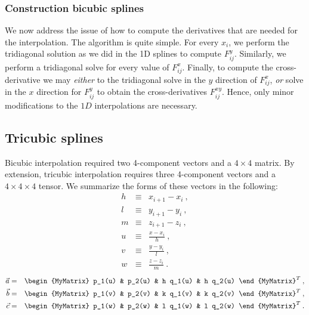 \subsubsection{Construction bicubic splines}
We now address the issue of how to compute the derivatives that are
needed for the interpolation.  The algorithm is quite simple.  For
every $x_i$, we perform the tridiagonal solution as we did in the 1D
splines to compute $F^y_{ij}$.  Similarly, we perform a tridiagonal
solve for every value of $F^x_{ij}$.  Finally, to compute the
cross-derivative we may {\em either} to the tridiagonal solve in the $y$
direction of $F^x_{ij}$, {\em or} solve in the $x$ direction for
$F^y_{ij}$ to obtain the cross-derivatives $F^{xy}_{ij}$.  Hence,
only minor modifications to the $1D$ interpolations are necessary.

\subsection{Tricubic splines}
Bicubic interpolation required two 4-component vectors and a $4 \times 4$
matrix.  By extension, tricubic interpolation requires three
4-component vectors and a $4 \times 4 \times 4$ tensor.  We summarize the forms of
these vectors in the following:
\begin{eqnarray}
h & \equiv & x_{i+1}-x_i\:, \\
l & \equiv & y_{i+1}-y_i\:, \\
m & \equiv & z_{i+1}-z_i\:, \\
u & \equiv & \frac{x-x_i}{h}\:, \\
v & \equiv & \frac{y-y_i}{l}\:, \\
w & \equiv & \frac{z-z_i}{m}\:.
\end{eqnarray}
\begin{eqnarray}
\vec{a} & = & 
\begin{MyMatrix}
p_1(u) & p_2(u) & h q_1(u) & h q_2(u) 
\end{MyMatrix}^T\:, \\
\vec{b} & = & 
\begin{MyMatrix}
p_1(v) & p_2(v) & k q_1(v) & k q_2(v) 
\end{MyMatrix}^T\:, \\
\vec{c} & = & 
\begin{MyMatrix}
p_1(w) & p_2(w) & l q_1(w) & l q_2(w) 
\end{MyMatrix}^T\:. 
\end{eqnarray}

